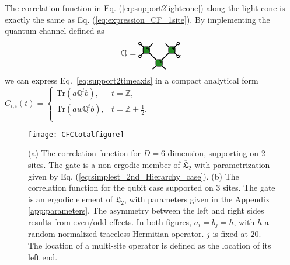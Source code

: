 \documentclass[aps,prx,twocolumn,notitlepage,nofootinbib,nobalancelastpage]{revtex4-2}
\theoremstyle{break}
\newcommand{\1}{\mathbbm{1}}
\theoremstyle{plain}
\theoremstyle{plain}
\theoremstyle{plain}
\newcommand{\Wgategreen}[2]{
\draw[very thick] (#1-0.5, #2 +0.5) -- (#1+0.5,#2-0.5);
\draw[very thick] (#1-0.5,#2-0.5) -- (#1+0.5,#2+0.5);
\draw[ thick, fill=mygreen, rounded corners=2pt] (#1-0.25,#2+0.25) rectangle (#1+0.25,#2-0.25);
\draw[thick] (#1,#2+0.15) -- (#1+0.15,#2+0.15) -- (#1+0.15,#2);
}
\newcommand{\MYcircle}[2]{
\draw[thick, fill=white] (#1,#2) circle (0.1cm); }
\newcommand{\MYsquareB}[2]{

\draw[ thick, fill=black, rounded corners=2pt] (#1-0.25,#2+0.25) rectangle (#1+0.25,#2-0.25);
\draw[thick, color=white] (#1,#2+0.15) -- (#1+0.15,#2+0.15) -- (#1+0.15,#2);
}
\newcommand{\pk}[1]{{\color{blue}[#1]}}
\begin{document}
%
The correlation function in Eq. (\ref{eq:support2lightcone}) along the light cone is exactly the same as Eq. (\ref{eq:expression_CF_1site}).
By implementing the quantum channel defined as
\begin{equation}
\mathbb{Q}=
\begin{tikzpicture}[baseline=(current  bounding  box.center), scale=0.55]
\Wgategreen{0}{0}
\Wgategreen{-1}{1}
\Wgategreen{1}{1}
\MYcircle{-1.5}{1.5}
\MYcircle{-1.5}{0.5}
\MYcircle{1.5}{1.5}
\MYcircle{1.5}{0.5}
\end{tikzpicture},
\end{equation}
we can express Eq.~\eqref{eq:support2timeaxis} in a compact analytical form $C_{i,i}(t)=\begin{cases}
    \mathrm{Tr}(a\mathbb{Q}^tb), &t=\mathbb{Z},\\
    \mathrm{Tr}(aw\mathbb{Q}^tb), &t=\mathbb{Z}+\frac{1}{2}.\\
\end{cases}$


\begin{figure}
\texttt{[image: CFCtotalfigure]}
\caption{(a) The correlation function for $D=6$ dimension, supporting on 2 sites. The gate is a non-ergodic member of $\overline{\mathfrak{L}}_2$ with parametrization given by Eq. (\ref{eq:simplest_2nd_Hierarchy_case}). 
(b) %
The correlation function for the qubit case supported on 3 sites. The gate is an ergodic element of $\overline{\mathfrak{L}}_2$, with parameters given in the Appendix \ref{app:parameters}. The asymmetry between the left and right sides results from even/odd effects.
In both figures, $a_{i}=b_{j}=h$, with $h$ a random normalized traceless Hermitian operator. 
$j$ is fixed at $20$. The location of a multi-site operator is defined as the location of its left end. 
}
\label{Correlation_func_sup2}
\end{figure}
\end{document}
